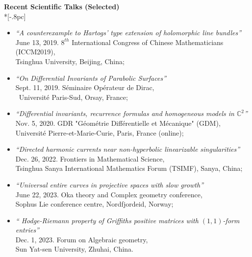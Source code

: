 \documentclass[12pt]{article}
\begin{document}
{\large \bf Recent Scientific Talks (Selected)} \\*[-.8pc]
\underline{\hspace{6.6in}} \\
\vspace{-0.7cm}
\begin{itemize} 

\item {\em ``A counterexample to Hartogs' type extension of holomorphic line bundles''}\\
 June 13, 2019. $8^{th}$ International Congress of Chinese Mathematicians (ICCM2019),\\ Tsinghua University, Beijing, China;

\vspace{-0.2cm}

\item {\em ``On Differential Invariants of Parabolic Surfaces''}\\
Sept. 11, 2019. S\'{e}minaire Op\'{e}rateur de Dirac, \\\
Universit\'{e} Paris-Sud, Orsay, France;

\vspace{-0.2cm}

\item {\em ``Differential invariants, recurrence formulas and homogeneous models in $\mathbb{C}^2$''}\\
Nov. 5, 2020. GDR "G\'{e}om\'{e}trie Diff\'{e}rentielle et M\'{e}canique" (GDM),\\
 Universit\'{e} Pierre-et-Marie-Curie, Paris, France (online);
 
 \clearpage
\vspace{-0.2cm}

\item {\em ``Directed harmonic currents near non-hyperbolic linearizable singularities''}\\
Dec. 26, 2022. Frontiers in Mathematical Science, \\
Tsinghua Sanya International Mathematics Forum (TSIMF), Sanya, China;

\vspace{-0.2cm}

\item {\em ``Universal entire curves in projective spaces with slow growth''}\\
June 22, 2023. Oka theory and Complex geometry conference,\\
 Sophus Lie conference centre, Nordfjordeid, Norway;

\vspace{-0.2cm}

\item {\em `` Hodge-Riemann property of Griffiths positive matrices with $(1,1)$-form entries''}\\
Dec. 1, 2023. Forum on Algebraic geometry,\\
Sun Yat-sen University, Zhuhai, China.
\end{itemize}
\end{document}
